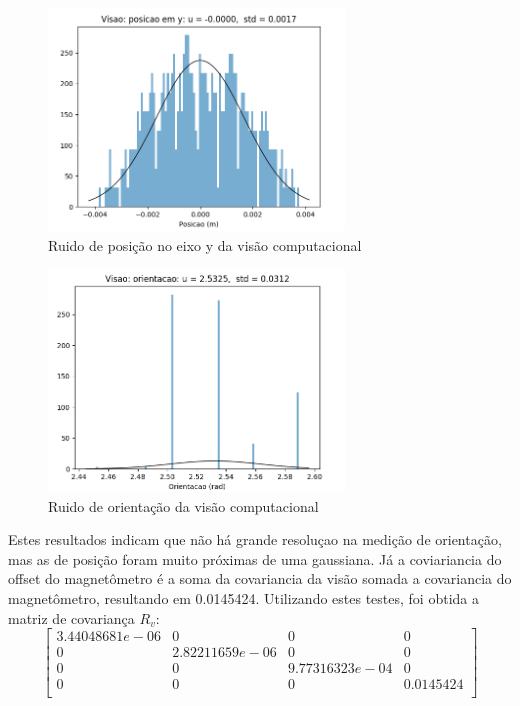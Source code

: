 \documentclass[
	12pt,				%
	openright,			%
	twoside,			%
	convert,
	a4paper,			%
	english,			%
	french,				%
	spanish,			%
	brazil				%
	]{abntex2}
\begin{document}
\begin{figure}[H]
	\caption{Ruido de posição no eixo y da visão computacional}
\begin{center}
   \includegraphics[width=0.7\textwidth]{visao_y_gaussiana}
\end{center}
\end{figure}
\begin{figure}[H]
	\caption{Ruido de orientação da visão computacional}
\begin{center}
   \includegraphics[width=0.7\textwidth]{visao_theta_gaussiana}
\end{center}
\end{figure}
Estes resultados indicam que não há grande resoluçao na medição de orientação, mas as de posição foram muito próximas de uma gaussiana. Já a coviariancia do offset do magnetômetro é a soma da covariancia da visão somada a covariancia do magnetômetro, resultando em 0.0145424.
Utilizando estes testes, foi obtida a matriz de covariança $R_v$:
\[
\begin{bmatrix}
	3.44048681e-06 & 0 & 0 & 0\\
	0 & 2.82211659e-06 & 0 & 0\\
	0 & 0 & 9.77316323e-04 & 0\\
	0 & 0 & 0 & 0.0145424\\
\end{bmatrix}
\]
\end{document}
